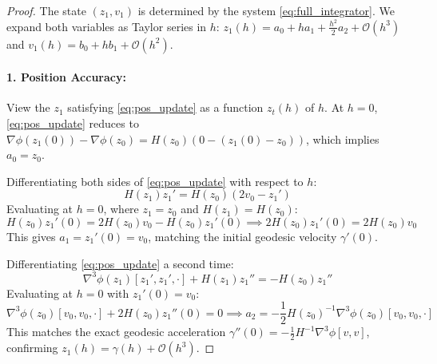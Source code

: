 \documentclass[11pt,a4paper]{article}
\begin{document}
\begin{proof}
The state $(z_1, v_1)$ is determined by the system \eqref{eq:full_integrator}. We expand both variables as Taylor series in $h$: $z_1(h) = a_0 + h a_1 + \frac{h^2}{2} a_2 + \mathcal{O}(h^3)$ and $v_1(h) = b_0 + h b_1 + \mathcal{O}(h^2)$.

\paragraph{1. Position Accuracy:}
View the $z_1$ satisfying \eqref{eq:pos_update} as a function $z_t(h)$ of $h$.
At $h=0$, \eqref{eq:pos_update} reduces to $\nabla \phi(z_1(0)) - \nabla \phi(z_0) = H(z_0)(0 - (z_1(0) - z_0))$, which implies $a_0 = z_0$.

Differentiating both sides of \eqref{eq:pos_update} with respect to $h$:
\begin{equation}
    H(z_1)z_1' = H(z_0)(2v_0 - z_1')
\end{equation}
Evaluating at $h=0$, where $z_1 = z_0$ and $H(z_1) = H(z_0)$:
\begin{equation}
    H(z_0)z_1'(0) = 2H(z_0)v_0 - H(z_0)z_1'(0) \implies 2H(z_0)z_1'(0) = 2H(z_0)v_0
\end{equation}
This gives $a_1 = z_1'(0) = v_0$, matching the initial geodesic velocity $\gamma'(0)$.

Differentiating \eqref{eq:pos_update} a second time:
\begin{equation}
    \nabla^3 \phi(z_1)[z_1', z_1', \cdot] + H(z_1)z_1'' = -H(z_0)z_1''
\end{equation}
Evaluating at $h=0$ with $z_1'(0) = v_0$:
\begin{equation}
    \nabla^3 \phi(z_0)[v_0, v_0, \cdot] + 2H(z_0)z_1''(0) = 0 \implies a_2 = -\frac{1}{2}H(z_0)^{-1}\nabla^3 \phi(z_0)[v_0, v_0, \cdot]
\end{equation}
This matches the exact geodesic acceleration $\gamma''(0) = -\frac{1}{2}H^{-1}\nabla^3\phi[v,v]$, confirming $z_1(h) = \gamma(h) + \mathcal{O}(h^3)$.


\end{proof}
\end{document}
